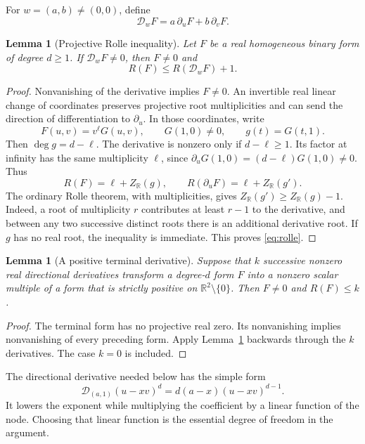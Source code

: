 \documentclass[11pt,a4paper]{article}
\numberwithin{equation}{section}
\newtheorem{lemma}[theorem]{Lemma}
\theoremstyle{remark}
\newcommand{\R}{\mathbb R}
\newcommand{\dd}{\mathcal D}
\begin{document}
For $w=(a,b)\ne(0,0)$, define
\[
 \dd_wF=a\,\partial_uF+b\,\partial_vF.
\]

\begin{lemma}[Projective Rolle inequality]\label{lem:rolle}
Let $F$ be a real homogeneous binary form of degree $d\ge1$. If
$\dd_wF\ne0$, then $F\ne0$ and
\begin{equation}\label{eq:rolle}
 R(F)\le R(\dd_wF)+1.
\end{equation}
\end{lemma}

\begin{proof}
Nonvanishing of the derivative implies $F\ne0$. An invertible real linear
change of coordinates preserves projective root multiplicities and can send
the direction of differentiation to $\partial_u$. In those coordinates,
write
\[
 F(u,v)=v^\ell G(u,v),\qquad G(1,0)\ne0,
 \qquad g(t)=G(t,1).
\]
Then $\deg g=d-\ell$. The derivative is nonzero only if $d-\ell\ge1$.
Its factor at infinity has the same multiplicity $\ell$, since
$\partial_uG(1,0)=(d-\ell)G(1,0)\ne0$. Thus
\[
 R(F)=\ell+Z_\R(g),\qquad
 R(\partial_uF)=\ell+Z_\R(g').
\]
The ordinary Rolle theorem, with multiplicities, gives
$Z_\R(g')\ge Z_\R(g)-1$. Indeed, a root of multiplicity $r$ contributes
at least $r-1$ to the derivative, and between any two successive distinct
roots there is an additional derivative root. If $g$ has no real root, the
inequality is immediate. This proves \eqref{eq:rolle}.
\end{proof}

\begin{lemma}[A positive terminal derivative]\label{lem:terminal}
Suppose that $k$ successive nonzero real directional derivatives transform
a degree-$d$ form $F$ into a nonzero scalar multiple of a form that is
strictly positive on $\R^2\setminus\{0\}$. Then $F\ne0$ and $R(F)\le k$.
\end{lemma}

\begin{proof}
The terminal form has no projective real zero. Its nonvanishing implies
nonvanishing of every preceding form. Apply Lemma~\ref{lem:rolle} backwards
through the $k$ derivatives. The case $k=0$ is included.
\end{proof}

The directional derivative needed below has the simple form
\begin{equation}\label{eq:directional-power}
 \dd_{(a,1)}(u-xv)^d=d(a-x)(u-xv)^{d-1}.
\end{equation}
It lowers the exponent while multiplying the coefficient by a linear
function of the node. Choosing that linear function is the essential degree
of freedom in the argument.
\end{document}
